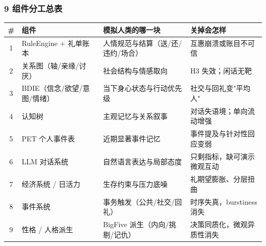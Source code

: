 \documentclass[AutoFakeBold,AutoFakeSlant]{beamer}
\begin{document}
\begin{frame}
    \frametitle{9 组件分工总表}
    \tiny
    \begin{tabularx}{\textwidth}{|c|l|X|X|}
        \toprule
        \textbf{\#} & \textbf{组件} & \textbf{模拟人类的哪一块} & \textbf{关掉会怎样} \\
        \midrule
        1 & RuleEngine + 礼单账本 & 人情规范与结算（送/还/违约/场合） & 互惠崩溃或账目不可信 \\
        \midrule
        2 & 关系图（轴/亲缘/讨厌） & 社会结构与情感取向 & H3 失效；闲话无靶 \\
        \midrule
        3 & BDIE（信念/欲望/意图/情绪） & 当下身心状态与行动优先级 & 社交与回礼变"平均人" \\
        \midrule
        4 & 认知树 & 主观记忆与关系叙事 & 对话失语境；单向流动增强 \\
        \midrule
        5 & PET 个人事件表 & 近期显著事件记忆 & 事件提及与针对性回应变弱 \\
        \midrule
        6 & LLM 对话系统 & 自然语言表达与局部态度 & 只剩指标，缺可演示微观互动 \\
        \midrule
        7 & 经济系统 / 日活力 & 生存约束与压力底噪 & 礼期望膨胀、分层扭曲 \\
        \midrule
        8 & 事件系统 & 事务触发（公共/社交/回礼） & 时序失真，burstiness 消失 \\
        \midrule
        9 & 性格 / 人格派生 & BigFive 派生（内向/挑剔/记仇） & 决策同质化，微观异质性消失 \\
        \bottomrule
    \end{tabularx}
\end{frame}
\end{document}
